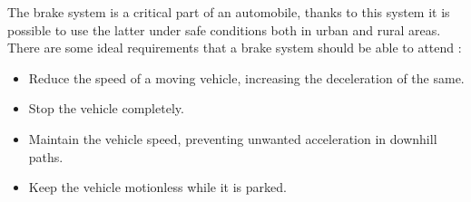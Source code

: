 
		The brake system is a critical part of an automobile, thanks to this system it is possible to use the latter under safe conditions both in urban and rural areas. There are some ideal requirements that a brake system should be able to attend \cite{kawaguchi}:

		\begin{itemize}
			\item Reduce the speed of a moving vehicle, increasing the deceleration of the same.
			\item Stop the vehicle completely.
			\item Maintain the vehicle speed, preventing unwanted acceleration in downhill paths.
			\item Keep the vehicle motionless while it is parked.
		\end{itemize}

